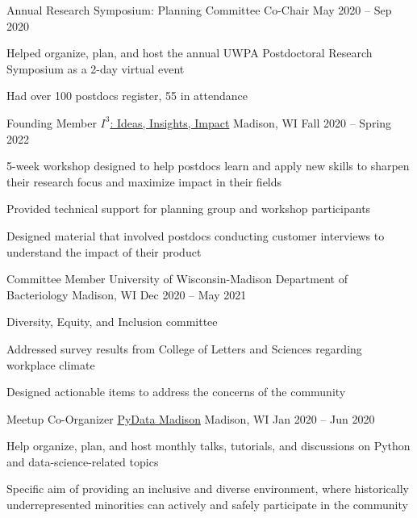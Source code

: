 \begin{cventries}
\cvsubposition
    {Annual Research Symposium: Planning Committee Co-Chair}
    {May 2020 -- Sep 2020}
    {
    \begin{cvitems}
        \item {Helped organize, plan, and host the annual UWPA Postdoctoral Research Symposium as a 2-day virtual event}
        \item {Had over 100 postdocs register, 55 in attendance}
     \end{cvitems}
    }

\cventry
    {Founding Member}
    {\href{https://uwpa.wisc.edu/i3-ideas-insights-impact/}{$I^3$: Ideas, Insights, Impact}}
    {Madison, WI}
    {Fall 2020 -- Spring 2022}
    {
    \begin{cvitems}
        \item {5-week workshop designed to help postdocs learn and apply new skills to sharpen their research focus and maximize impact in their fields}
        \item {Provided technical support for planning group and workshop participants}
        \item {Designed material that involved postdocs conducting customer interviews to understand the impact of their product}
    \end{cvitems}
    }

\cventry
    {Committee Member}
    {University of Wisconsin-Madison Department of Bacteriology}
    {Madison, WI}
    {Dec 2020 -- May 2021}
    {
    \begin{cvitems}
        \item {Diversity, Equity, and Inclusion committee}
        \item {Addressed survey results from College of Letters and Sciences regarding workplace climate}
        \item {Designed actionable items to address the concerns of the community}
    \end{cvitems}
    }
    
\cventry
    {Meetup Co-Organizer}
    {\href{https://www.meetup.com/PyData-Madison/}{PyData Madison}}
    {Madison, WI}
    {Jan 2020 -- Jun 2020}
    {
    \begin{cvitems}
        \item {Help organize, plan, and host monthly talks, tutorials, and discussions on Python and data-science-related topics}
        \item {Specific aim of providing an inclusive and diverse environment, where historically underrepresented minorities can actively and safely participate in the community}
    \end{cvitems}
    }
    

\end{cventries}
